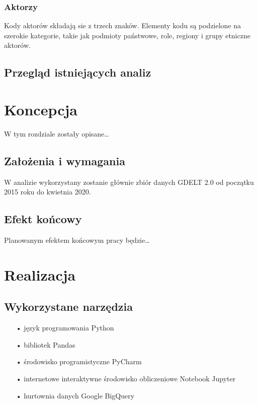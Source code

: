 \documentclass[11pt]{report}
\begin{document}
    \subsection{Aktorzy}
    Kody aktorów składają sie z trzech znaków.
    Elementy kodu są podzielone na szerokie kategorie, takie jak podmioty państwowe, role, regiony i grupy etniczne aktorów.


    \section{Przegląd istniejących analiz} \label{ch:przeglad}


    \chapter{Koncepcja}
    W tym rozdziale zostały opisane\ldots


    \section{Założenia i wymagania}
    W analizie wykorzystany zostanie głównie zbiór danych GDELT 2.0 od początku 2015 roku do kwietnia 2020.


    \section{Efekt końcowy}
    Planowanym efektem końcowym pracy będzie\ldots


    \chapter{Realizacja}


    \section{Wykorzystane narzędzia}

    \begin{enumerate}
        \item[•] język programowania Python~\cite{python}
        \item[•] bibliotek Pandas~\cite{pandas}
        \item[•] środowisko programistyczne PyCharm~\cite{pycharm}
        \item[•] internetowe interaktywne środowisko obliczeniowe Notebook Jupyter~\cite{jupyter}
        \item[•] hurtownia danych Google BigQuery~\cite{bigquery}
    \end{enumerate}
\end{document}
